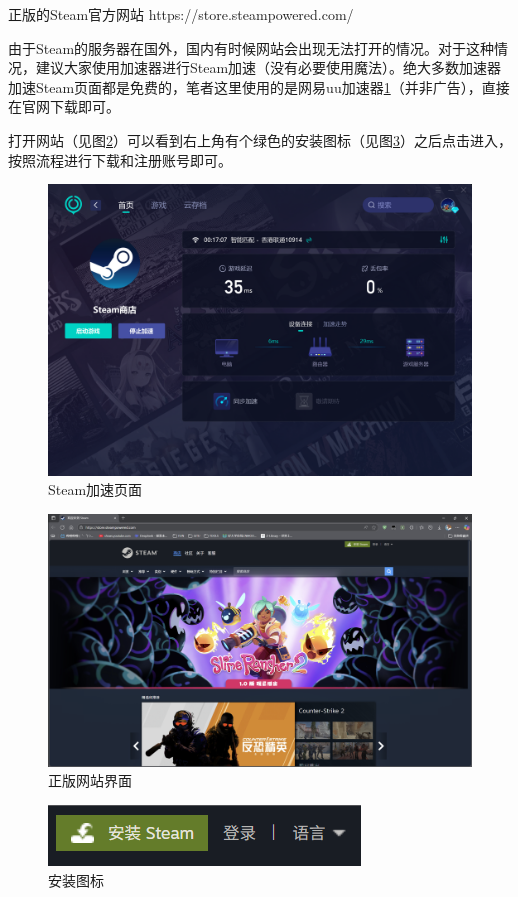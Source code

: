 \documentclass{article}
\begin{document}
    正版的Steam官方网站
    https://store.steampowered.com/
    
    由于Steam的服务器在国外，国内有时候网站会出现无法打开的情况。对于这种情况，建议大家使用加速器进行Steam加速（没有必要使用魔法）。绝大多数加速器加速Steam页面都是免费的，笔者这里使用的是网易uu加速器\ref{fig:uu}（并非广告），直接在官网下载即可。
    
    打开网站（见图\ref{fig:Steam正版网页}）可以看到右上角有个绿色的安装图标（见图\ref{fig:Steam安装图标}）之后点击进入，按照流程进行下载和注册账号即可。
    
    \begin{figure}[H]
    \centering
    \includegraphics[width=0.7\linewidth]{图/uu加速器.png}
    \caption{\label{fig:uu}Steam加速页面}
    \end{figure}
    \begin{figure}[H]
    \centering
    \includegraphics[width=0.7\linewidth]{图/Steam网页.png}
    \caption{\label{fig:Steam正版网页}正版网站界面}
    \end{figure}
    \begin{figure}[H]
    \centering
    \includegraphics[width=0.7\linewidth]{图/安装图标.png}
    \caption{\label{fig:Steam安装图标}安装图标}
    \end{figure}
    
\end{document}
